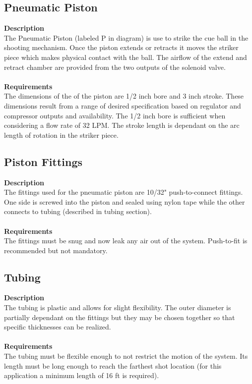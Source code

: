 \documentclass[titlepage]{article}
\begin{document}
\subsection{Pneumatic Piston}
\textbf{Description}\\
The Pneumatic Piston (labeled P in diagram) is use to strike the cue ball in the shooting mechanism. Once the piston extends or retracts it moves the striker piece which makes physical contact with the ball. The airflow of the extend and retract chamber are provided from the two outputs of the solenoid valve.\\~\\
\textbf{Requirements}\\
 The dimensions of the of the piston are 1/2 inch bore and 3 inch stroke. These dimensions result from a range of desired specification based on regulator and compressor outputs and availability. The 1/2 inch bore is sufficient when considering a flow rate of 32 LPM. The stroke length is dependant on the arc length of rotation in the striker piece.


\subsection{Piston Fittings}
\textbf{Description}\\
The fittings used for the pneumatic piston are 10/32" push-to-connect fittings. One side is screwed into the piston and sealed using nylon tape while the other connects to tubing (described in tubing section). \\~\\
\textbf{Requirements}\\
The fittings must be snug and now leak any air out of the system. Push-to-fit is recommended but not mandatory. 


\subsection{Tubing}
\textbf{Description}\\
The tubing is plastic and allows for slight flexibility. The outer diameter is partially dependant on the fittings but they may be chosen together so that specific thicknesses can be realized.\\~\\
\textbf{Requirements}\\
The tubing must be flexible enough to not restrict the motion of the system. Its length must be long enough to reach the farthest shot location (for this application a minimum length of 16 ft is required).
\end{document}

